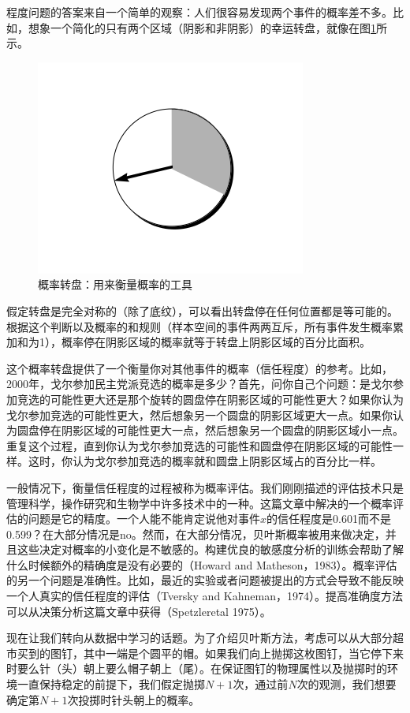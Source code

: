 \documentclass[10pt,a4paper]{article}
\begin{document}
\begin{CJK*}{UTF8}{gkai}
程度问题的答案来自一个简单的观察：人们很容易发现两个事件的概率差不多。比如，想象一个简化的只有两个区域（阴影和非阴影）的幸运转盘，就像在图\ref{fig:wheel}所示。
\begin{figure}[!htbp]
	\centering
    	\includegraphics[scale=0.4]{figs/wheel.png}
	\caption{概率转盘：用来衡量概率的工具}    
	\label{fig:wheel}
\end{figure}
假定转盘是完全对称的（除了底纹），可以看出转盘停在任何位置都是等可能的。根据这个判断以及概率的和规则（样本空间的事件两两互斥，所有事件发生概率累加和为1），概率停在阴影区域的概率就等于转盘上阴影区域的百分比面积。


这个概率转盘提供了一个衡量你对其他事件的概率（信任程度）的参考。比如，2000年，戈尔参加民主党派竞选的概率是多少？首先，问你自己个问题：是戈尔参加竞选的可能性更大还是那个旋转的圆盘停在阴影区域的可能性更大？如果你认为戈尔参加竞选的可能性更大，然后想象另一个圆盘的阴影区域更大一点。如果你认为圆盘停在阴影区域的可能性更大一点，然后想象另一个圆盘的阴影区域小一点。重复这个过程，直到你认为戈尔参加竞选的可能性和圆盘停在阴影区域的可能性一样。这时，你认为戈尔参加竞选的概率就和圆盘上阴影区域占的百分比一样。


一般情况下，衡量信任程度的过程被称为概率评估。我们刚刚描述的评估技术只是管理科学，操作研究和生物学中许多技术中的一种。这篇文章中解决的一个概率评估的问题是它的精度。一个人能不能肯定说他对事件$x$的信任程度是0.601而不是0.599？在大部分情况是no。然而，在大部分情况，贝叶斯概率被用来做决定，并且这些决定对概率的小变化是不敏感的。构建优良的敏感度分析的训练会帮助了解什么时候额外的精确度是没有必要的（Howard and Matheson，1983）。概率评估的另一个问题是准确性。比如，最近的实验或者问题被提出的方式会导致不能反映一个人真实的信任程度的评估（Tversky and Kahneman，1974）。提高准确度方法可以从决策分析这篇文章中获得（Spetzleretal 1975）。


现在让我们转向从数据中学习的话题。为了介绍贝叶斯方法，考虑可以从大部分超市买到的图钉，其中一端是个圆平的帽。如果我们向上抛掷这枚图钉，当它停下来时要么针（头）朝上要么帽子朝上（尾）。在保证图钉的物理属性以及抛掷时的环境一直保持稳定的前提下，我们假定抛掷$N+1$次，通过前$N$次的观测，我们想要确定第$N+1$次投掷时针头朝上的概率。



\end{CJK*}
\end{document}
